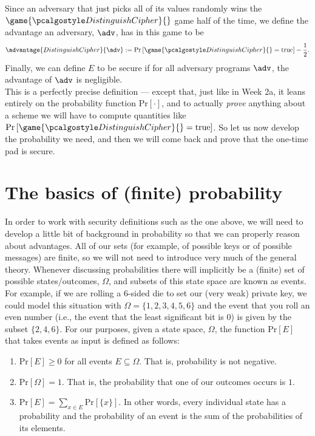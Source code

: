 \documentclass[12pt]{article}
\newcommand{\pr}[1]{\text{Pr}\left[#1\right]}
\theoremstyle{definition}
\theoremstyle{remark}
\theoremstyle{definition}
\begin{document}
Since an adversary that just picks all of its values randomly wins the $\game{\algo{DistinguishCipher}}{}$ game half of the time, we define the advantage an adversary, $\adv$, has in this game to be $$\advantage{DistinguishCipher}{\adv} := \pr{\game{\algo{DistinguishCipher}}{} = \text{true}} - \frac{1}{2}.$$ Finally, we can define $E$ to be secure if for all adversary programs $\adv$, the advantage of $\adv$ is negligible.\\

This is a perfectly precise definition --- except that, just like in Week 2a, it leans entirely on the probability function $\pr{\cdot}$, and to actually \emph{prove} anything about a scheme we will have to compute quantities like $\pr{\game{\algo{DistinguishCipher}}{} = \text{true}}$. So let us now develop the probability we need, and then we will come back and prove that the one-time pad is secure.

\section*{The basics of (finite) probability}

In order to work with security definitions such as the one above, we will need to develop a little bit of background in probability so that we can properly reason about advantages. All of our sets (for example, of possible keys or of possible messages) are finite, so we will not need to introduce very much of the general theory. Whenever discussing probabilities there will implicitly be a (finite) set of possible states/outcomes, $\Omega$, and subsets of this state space are known as events. For example, if we are rolling a $6$-sided die to set our (very weak) private key, we could model this situation with $\Omega = \{1,2,3,4,5,6\}$ and the event that you roll an even number (i.e., the event that the least significant bit is 0) is given by the subset $\{2,4,6\}$. For our purposes, given a state space, $\Omega$, the function $\pr{E}$ that takes events as input is defined as follows:

\begin{enumerate}
\item $\pr{E}\geq 0$ for all events $E\subseteq \Omega$. That is, probability is not negative.
\item $\pr{\Omega} = 1$. That is, the probability that one of our outcomes occurs is $1$.
\item $\pr{E} = \sum_{x\in E}\pr{\{x\}}$. In other words, every individual state has a probability and the probability of an event is the sum of the probabilities of its elements.
\end{enumerate}
\end{document}
